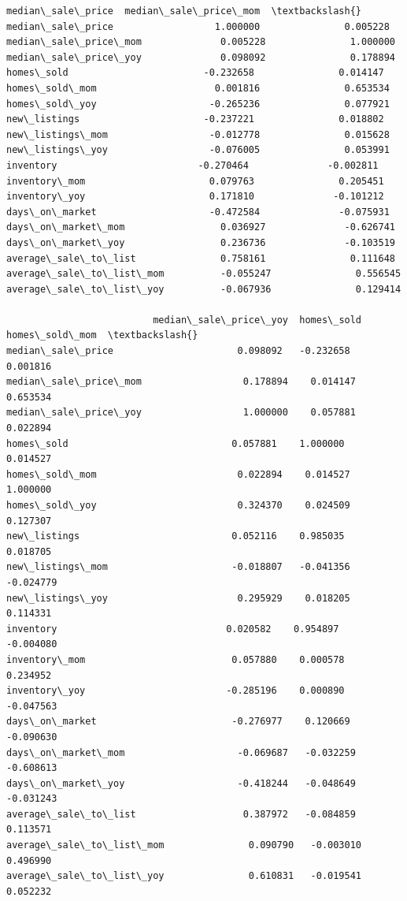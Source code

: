 \documentclass[11pt]{article}
\begin{document}
    
    \begin{Verbatim}[commandchars=\\\{\}]
                          median\_sale\_price  median\_sale\_price\_mom  \textbackslash{}
median\_sale\_price                  1.000000               0.005228   
median\_sale\_price\_mom              0.005228               1.000000   
median\_sale\_price\_yoy              0.098092               0.178894   
homes\_sold                        -0.232658               0.014147   
homes\_sold\_mom                     0.001816               0.653534   
homes\_sold\_yoy                    -0.265236               0.077921   
new\_listings                      -0.237221               0.018802   
new\_listings\_mom                  -0.012778               0.015628   
new\_listings\_yoy                  -0.076005               0.053991   
inventory                         -0.270464              -0.002811   
inventory\_mom                      0.079763               0.205451   
inventory\_yoy                      0.171810              -0.101212   
days\_on\_market                    -0.472584              -0.075931   
days\_on\_market\_mom                 0.036927              -0.626741   
days\_on\_market\_yoy                 0.236736              -0.103519   
average\_sale\_to\_list               0.758161               0.111648   
average\_sale\_to\_list\_mom          -0.055247               0.556545   
average\_sale\_to\_list\_yoy          -0.067936               0.129414   

                          median\_sale\_price\_yoy  homes\_sold  homes\_sold\_mom  \textbackslash{}
median\_sale\_price                      0.098092   -0.232658        0.001816   
median\_sale\_price\_mom                  0.178894    0.014147        0.653534   
median\_sale\_price\_yoy                  1.000000    0.057881        0.022894   
homes\_sold                             0.057881    1.000000        0.014527   
homes\_sold\_mom                         0.022894    0.014527        1.000000   
homes\_sold\_yoy                         0.324370    0.024509        0.127307   
new\_listings                           0.052116    0.985035        0.018705   
new\_listings\_mom                      -0.018807   -0.041356       -0.024779   
new\_listings\_yoy                       0.295929    0.018205        0.114331   
inventory                              0.020582    0.954897       -0.004080   
inventory\_mom                          0.057880    0.000578        0.234952   
inventory\_yoy                         -0.285196    0.000890       -0.047563   
days\_on\_market                        -0.276977    0.120669       -0.090630   
days\_on\_market\_mom                    -0.069687   -0.032259       -0.608613   
days\_on\_market\_yoy                    -0.418244   -0.048649       -0.031243   
average\_sale\_to\_list                   0.387972   -0.084859        0.113571   
average\_sale\_to\_list\_mom               0.090790   -0.003010        0.496990   
average\_sale\_to\_list\_yoy               0.610831   -0.019541        0.052232   


\end{Verbatim}
\end{document}
